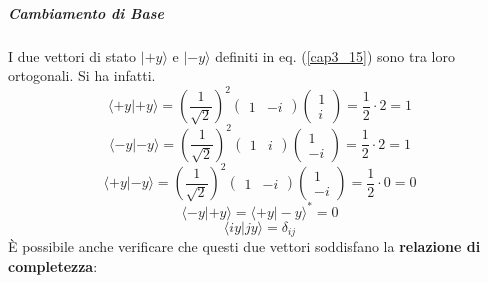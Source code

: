 \subparagraph{Cambiamento di Base}
I due vettori di stato $| +y \rangle $ e $| -y \rangle$ definiti in eq. (\ref{cap3_15}) sono tra loro ortogonali. Si ha infatti.
	\begin{equation}
		\langle +y | +y \rangle=\left(\frac{1}{\sqrt{2}}\right)^2
		\begin{pmatrix}
		1 & -i
		\end{pmatrix}
		\begin{pmatrix}
		1 \\
		i
		\end{pmatrix}=
		\frac{1}{2}\cdot 2= 1
	\end{equation}
	\begin{equation}
		\langle -y | -y \rangle =\left(\frac{1}{\sqrt{2}}\right)^2
		\begin{pmatrix}
		1 & i
		\end{pmatrix}
		\begin{pmatrix}
1 \\
-i
\end{pmatrix}=
		\frac{1}{2}\cdot 2= 1
	\end{equation}
		\begin{equation}
		\langle +y | -y \rangle =\left(\frac{1}{\sqrt{2}}\right)^2
		\begin{pmatrix}
		1 & -i
		\end{pmatrix}
		\begin{pmatrix}
		1 \\
		-i
		\end{pmatrix}=
		\frac{1}{2}\cdot 0= 0
	\end{equation}
	\begin{equation}
		\langle -y | +y \rangle = \langle +y | -y \rangle ^*=0
	\end{equation}
	\begin{equation}
		\langle iy | jy \rangle = \delta_{ij}
	\end{equation}
È possibile anche verificare che questi due vettori soddisfano la \textbf{relazione di completezza}:
